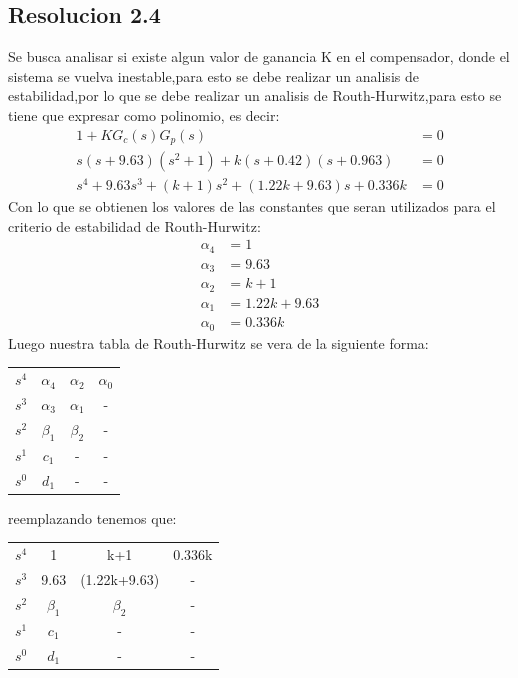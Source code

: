 \documentclass[
  11pt,
  letterpaper,
   addpoints,
   answers
  ]{exam}
\begin{document}
\begin{questions}
\begin{solution}
\subsection*{Resolucion 2.4}
Se busca analisar si existe algun valor de ganancia K en el compensador, donde el sistema se vuelva inestable,para esto se debe realizar un analisis de estabilidad,por lo que se debe realizar un analisis de Routh-Hurwitz,para esto se tiene que expresar como polinomio, es decir:
\begin{align}
    1+KG_{c}(s)G_{p}(s) &= 0\\
    s(s+9.63)(s^{2}+1) + k(s+0.42)(s+0.963)&=0\\
    s^{4}+9.63s^{3} + (k+1)s^{2} + (1.22k+9.63)s + 0.336k &= 0
\end{align}
Con lo que se obtienen los valores de las constantes que seran utilizados para el criterio de estabilidad de Routh-Hurwitz:
\begin{align}
    \alpha_{4} &= 1\\
    \alpha_{3} &= 9.63\\
    \alpha_{2} &= k+1\\
    \alpha_{1}&= 1.22k+9.63\\
    \alpha_{0}&= 0.336k
\end{align}
Luego nuestra tabla de Routh-Hurwitz se vera de la siguiente forma:
\begin{center}
    \begin{tabular}{|c|c|c|c|}
        \hline
        $s^{4}$ & $\alpha_{4}$ & $\alpha_{2}$  & $\alpha_{0}$ \\
        $s^{3}$ & $\alpha_{3}$ & $\alpha_{1}$  & -\\
        $s^{2}$ & $\beta_{1}$ & $\beta_{2}$  & -\\
        $s^{1}$ & $c_{1}$  & -   & -\\
        $s^{0}$ & $d_{1}$ & -  & - \\
        \hline
    \end{tabular}
\end{center}
reemplazando tenemos que:
\begin{center}
    \begin{tabular}{|c|c|c|c|}
        \hline
        $s^{4}$ & 1  & k+1  & 0.336k \\
        $s^{3}$ & 9.63 & (1.22k+9.63)  & -\\
        $s^{2}$ & $\beta_{1}$ & $\beta_{2}$  & -\\
        $s^{1}$ & $c_{1}$  & -   & -\\
        $s^{0}$ & $d_{1}$ & -  & - \\

\end{tabular}
\end{center}
\end{solution}
\end{questions}
\end{document}
